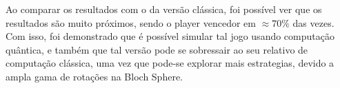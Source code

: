 \documentclass[12pt]{elsarticle}
\begin{document}
Ao comparar os resultados com o da versão clássica, foi possível ver que os resultados são muito próximos, sendo o player vencedor em $\approx 70\%$ das vezes. Com isso, foi demonstrado que é possível simular tal jogo usando computação quântica, e também que tal versão pode se sobressair ao seu relativo de computação clássica, uma vez que pode-se explorar mais estrategias, devido a ampla gama de rotações na Bloch Sphere.


\nocite{alexandre_2024_dpbmscientificinitiation1quantumoracles}
\nocite{klubnika_2023_buckshot}

 





\end{document}
